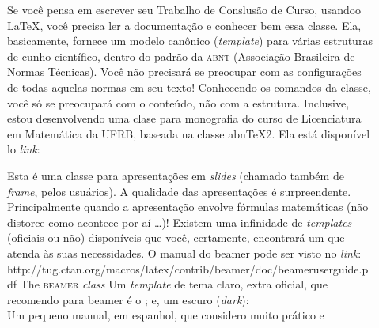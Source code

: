 \begin{description}
  \item[] Se você pensa em escrever seu Trabalho de Conslusão 
                   de Curso, usandoo \LaTeX, você precisa ler a documentação e 
                   conhecer bem essa classe.
                   Ela, basicamente, fornece um modelo canônico (\textit{template})
                   para várias estruturas de cunho científico, dentro do padrão 
                   da \textsc{abnt} (Associação Brasileira de Normas Técnicas).
                   Você não precisará se preocupar com as configurações de todas
                   aquelas normas em seu texto!
                   Conhecendo os comandos da classe, você só se preocupará com 
                   o \textsf{conteúdo}, não com a \textsf{estrutura}.
                   Inclusive, estou desenvolvendo uma clase para monografia do 
                   curso de Licenciatura em Matemática da UFRB, baseada na classe
                   abn\TeX 2.
                   Ela está disponível lo \textit{link}: 
  \item[] Esta é uma classe para apresentações em \textit{slides} 
                   (chamado também de \textit{frame}, pelos usuários).
                   A qualidade das apresentações é surpreendente. 
                   Principalmente quando a apresentação envolve fórmulas 
                   matemáticas (não distorce como acontece por aí \ldots)!
                   Existem uma infinidade de \textit{templates} (oficiais ou não) 
                   disponíveis que você, certamente, encontrará um que atenda às 
                   suas necessidades.
                   O manual do \textsf{beamer} pode ser visto no \textit{link}:
                   \hrefB
                   {
                     http://tug.ctan.org/macros/latex/contrib/beamer/doc/beameruserguide.pdf
                   }
                   {
                     The \textsc{beamer} \textit{class}
                   }
                   \newline
                   Um \textit{template} de tema claro, extra oficial, que 
                   recomendo para \textsf{beamer} é o 
                   ;
                   e, um escuro (\textit{dark}): 
                    \\
                   Um pequeno manual, em espanhol, que considero muito prático e 

\end{description}
